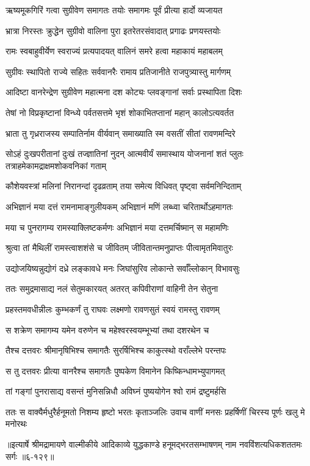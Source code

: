 \twolineshloka
{ऋष्यमूकगिरिं गत्वा सुग्रीवेण समागतः}
{तयोः समागमः पूर्वं प्रीत्या हार्दो व्यजायत} %

\twolineshloka
{भ्रात्रा निरस्तः क्रुद्धेन सुग्रीवो वालिना पुरा}
{इतरेतरसंवादात् प्रगाढः प्रणयस्तयोः} %

\twolineshloka
{रामः स्वबाहुवीर्येण स्वराज्यं प्रत्यपादयत्}
{वालिनं समरे हत्वा महाकायं महाबलम्} %

\twolineshloka
{सुग्रीवः स्थापितो राज्ये सहितः सर्ववानरैः}
{रामाय प्रतिजानीते राजपुत्र्यास्तु मार्गणम्} %

\twolineshloka
{आदिष्टा वानरेन्द्रेण सुग्रीवेण महात्मना}
{दश कोट्यः प्लवङ्गानां सर्वाः प्रस्थापिता दिशः} %

\twolineshloka
{तेषां नो विप्रकृष्टानां विन्ध्ये पर्वतसत्तमे}
{भृशं शोकाभितप्तानां महान् कालोऽत्यवर्तत} %

\twolineshloka
{भ्राता तु गृध्रराजस्य सम्पातिर्नाम वीर्यवान्}
{समाख्याति स्म वसतीं सीतां रावणमन्दिरे} %

\threelineshloka
{सोऽहं दुःखपरीतानां दुःखं तज्ज्ञातिनां नुदन्}
{आत्मवीर्यं समास्थाय योजनानां शतं प्लुतः}
{तत्राहमेकामद्राक्षमशोकवनिकां गताम्} %

\twolineshloka
{कौशेयवस्त्रां मलिनां निरानन्दां दृढव्रताम्}
{तया समेत्य विधिवत् पृष्ट्वा सर्वमनिन्दिताम्} %

\twolineshloka
{अभिज्ञानं मया दत्तं रामनामाङ्गुलीयकम्}
{अभिज्ञानं मणिं लब्ध्वा चरितार्थोऽहमागतः} %

\twolineshloka
{मया च पुनरागम्य रामस्याक्लिष्टकर्मणः}
{अभिज्ञानं मया दत्तमर्चिष्मान् स महामणिः} %

\twolineshloka
{श्रुत्वा तां मैथिलीं रामस्त्वाशशंसे च जीवितम्}
{जीवितान्तमनुप्राप्तः पीत्वामृतमिवातुरः} %

\twolineshloka
{उद्योजयिष्यन्नुद्योगं दध्रे लङ्कावधे मनः}
{जिघांसुरिव लोकान्ते सर्वाँल्लोकान् विभावसुः} %

\twolineshloka
{ततः समुद्रमासाद्य नलं सेतुमकारयत्}
{अतरत् कपिवीराणां वाहिनी तेन सेतुना} %

\twolineshloka
{प्रहस्तमवधीन्नीलः कुम्भकर्णं तु राघवः}
{लक्ष्मणो रावणसुतं स्वयं रामस्तु रावणम्} %

\twolineshloka
{स शक्रेण समागम्य यमेन वरुणेन च}
{महेश्वरस्वयम्भूभ्यां तथा दशरथेन च} %

\twolineshloka
{तैश्च दत्तवरः श्रीमानृषिभिश्च समागतैः}
{सुरर्षिभिश्च काकुत्स्थो वराँल्लेभे परन्तपः} %

\twolineshloka
{स तु दत्तवरः प्रीत्या वानरैश्च समागतैः}
{पुष्पकेण विमानेन किष्किन्धामभ्युपागमत्} %

\twolineshloka
{तां गङ्गां पुनरासाद्य वसन्तं मुनिसन्निधौ}
{अविघ्नं पुष्ययोगेन श्वो रामं द्रष्टुमर्हसि} %

\twolineshloka
{ततः स वाक्यैर्मधुरैर्हनूमतो निशम्य हृष्टो भरतः कृताञ्जलिः}
{उवाच वाणीं मनसः प्रहर्षिणीं चिरस्य पूर्णः खलु मे मनोरथः} %


॥इत्यार्षे श्रीमद्रामायणे वाल्मीकीये आदिकाव्ये युद्धकाण्डे हनूमद्भरतसम्भाषणम् नाम नवविंशत्यधिकशततमः सर्गः ॥६-१२९॥
